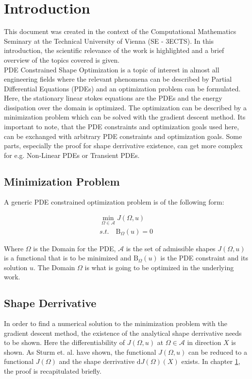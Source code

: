\section{Introduction}

This document was created in the context of the Computational Mathematics Seminary
at the Technical University of Vienna (SE - 3ECTS). In this introduction, the scientific relevance
of the work is highlighted and a brief overview of the topics covered is given.\\

PDE Constrained Shape Optimization is a topic of interest in almost all engineering fields
where the relevant phenomena can be described by Partial Differential Equations (PDEs) and
an optimization problem can be formulated. Here, the stationary linear stokes equations are
the PDEs and the energy dissipation over the domain is optimized. The optimization can 
be described by a minimization problem which can be solved with the gradient descent method.
Its important to note, that the PDE constraints and optimization goals used here, 
can be exchanged with arbitrary PDE constraints and optimization goals. Some parts,
especially the proof for shape derrivative existence, can get more complex for e.g. 
Non-Linear PDEs or Transient PDEs.\\

\subsection*{Minimization Problem}
A generic PDE constrained optimization problem is of the following form:

\begin{align*}
        \min_{ \Omega \in \mathcal{A} } J( \Omega, u) \\
        s.t. \quad \mathrm{B}_{\Omega}(u) = 0
\end{align*}

Where $\Omega$ is the Domain for the PDE, $\mathcal{A}$ is the set of admissible shapes
$J(\Omega, u)$ is a functional that is to be minimized and $\mathrm{B}_{\Omega}(u)$ is the PDE
constraint and its solution $u$. The Domain $\Omega$ is what is going to be 
optimized in the underlying work. \\

\subsection*{Shape Derrivative}
In order to find a numerical solution to the minimization problem with the gradient descent
method, the existence of the analytical shape derrivative needs to be shown. Here the
differentiability of $J(\Omega,u)$ at $\Omega \in \mathcal{A}$ in direction $X$ is shown. 
As Sturm et. al. \cite{nearly_conformal_paper} have shown, the functional 
$J(\Omega, u)$ can be reduced to a functional $J(\Omega)$ and the shape derrivative 
$\mathrm{d}J(\Omega)(X)$ exists. In chapter \ref*{}, the proof is recapitulated briefly.

